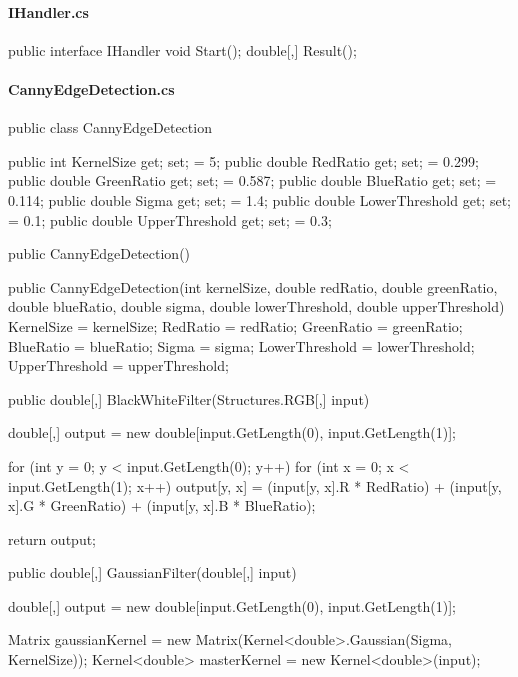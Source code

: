 \begin{flushleft}
    
    \paragraph{IHandler.cs}
    \begin{cscode}
public interface IHandler
{
    void Start();
    double[,] Result();
}
    \end{cscode}
\pagebreak
    
    
    \paragraph{CannyEdgeDetection.cs}
    \begin{cscode}
public class CannyEdgeDetection
{
    public int KernelSize { get; set; } = 5;
    public double RedRatio { get; set; } = 0.299;
    public double GreenRatio { get; set; } = 0.587;
    public double BlueRatio { get; set; } = 0.114;
    public double Sigma { get; set; } = 1.4;
    public double LowerThreshold { get; set; } = 0.1;
    public double UpperThreshold { get; set; } = 0.3;

    public CannyEdgeDetection() { }

    public CannyEdgeDetection(int kernelSize, double redRatio, double greenRatio, double blueRatio, double sigma, double lowerThreshold, double upperThreshold)
    {
        KernelSize = kernelSize;
        RedRatio = redRatio;
        GreenRatio = greenRatio;
        BlueRatio = blueRatio;
        Sigma = sigma;
        LowerThreshold = lowerThreshold;
        UpperThreshold = upperThreshold;
    }

    public double[,] BlackWhiteFilter(Structures.RGB[,] input)
    {
        double[,] output = new double[input.GetLength(0), input.GetLength(1)];

        for (int y = 0; y < input.GetLength(0); y++)
        {
            for (int x = 0; x < input.GetLength(1); x++)
            {
                output[y, x] = (input[y, x].R * RedRatio) + (input[y, x].G * GreenRatio) + (input[y, x].B * BlueRatio);
            }
        }

        return output;
    }

    public double[,] GaussianFilter(double[,] input)
    {
        double[,] output = new double[input.GetLength(0), input.GetLength(1)];

        Matrix gaussianKernel = new Matrix(Kernel<double>.Gaussian(Sigma, KernelSize));
        Kernel<double> masterKernel = new Kernel<double>(input);

}}
\end{cscode}
\end{flushleft}
